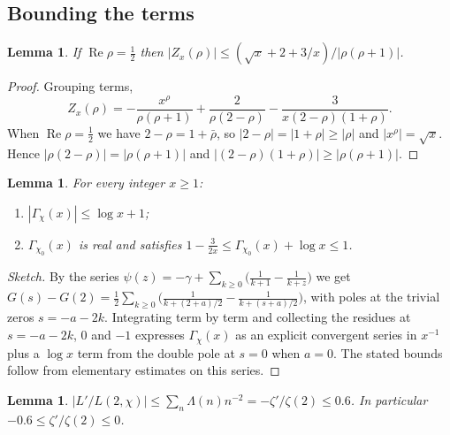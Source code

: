 \documentclass[11pt]{amsart}
\newtheorem{lemma}[theorem]{Lemma}
\theoremstyle{definition}
\theoremstyle{remark}
\newcommand{\Lam}{\Lambda}
\renewcommand{\Re}{\operatorname{Re}}
\begin{document}
\subsection{Bounding the terms}

\begin{lemma}\label{lem:zeroterm}
If $\Re\rho=\tfrac12$ then $|Z_x(\rho)|\le(\sqrt x+2+3/x)/|\rho(\rho+1)|$.
\end{lemma}
\begin{proof}
Grouping terms,
\[
Z_x(\rho)=-\frac{x^\rho}{\rho(\rho+1)}+\frac{2}{\rho(2-\rho)}-\frac{3}{x(2-\rho)(1+\rho)}.
\]
When $\Re\rho=\tfrac12$ we have $2-\rho=1+\bar\rho$, so $|2-\rho|=|1+\rho|\ge|\rho|$ and $|x^\rho|=\sqrt x$. Hence $|\rho(2-\rho)|=|\rho(\rho+1)|$ and $|(2-\rho)(1+\rho)|\ge|\rho(\rho+1)|$.
\end{proof}

\begin{lemma}\label{lem:gamma}
For every integer $x\ge1$:
\begin{enumerate}
\item $|\Gamma_\chi(x)|\le\log x+1$;
\item $\Gamma_{\chi_0}(x)$ is real and satisfies $1-\frac{3}{2x}\le\Gamma_{\chi_0}(x)+\log x\le1$.
\end{enumerate}
\end{lemma}
\begin{proof}[Sketch]
By the series $\psi(z)=-\gamma+\sum_{k\ge0}\bigl(\frac1{k+1}-\frac1{k+z}\bigr)$ we get $G(s)-G(2)=\tfrac12\sum_{k\ge0}\bigl(\frac1{k+(2+a)/2}-\frac1{k+(s+a)/2}\bigr)$, with poles at the trivial zeros $s=-a-2k$. Integrating term by term and collecting the residues at $s=-a-2k$, $0$ and $-1$ expresses $\Gamma_\chi(x)$ as an explicit convergent series in $x^{-1}$ plus a $\log x$ term from the double pole at $s=0$ when $a=0$. The stated bounds follow from elementary estimates on this series.
\end{proof}

\begin{lemma}\label{lem:two}
$|L'/L(2,\chi)|\le\sum_n\Lam(n)n^{-2}=-\zeta'/\zeta(2)\le0.6$. In particular $-0.6\le\zeta'/\zeta(2)\le0$.
\end{lemma}
\end{document}
